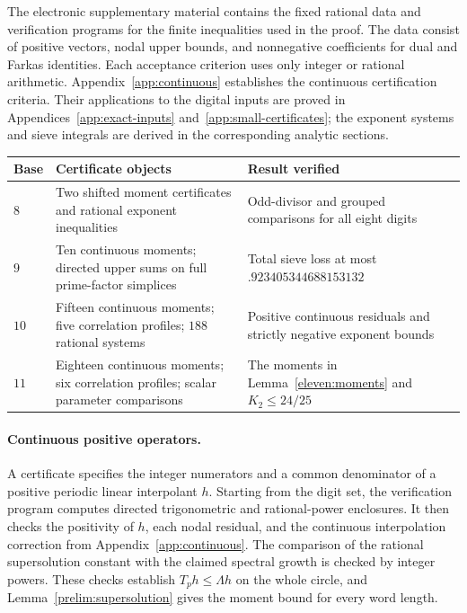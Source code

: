 \documentclass[11pt,a4paper]{article}
\theoremstyle{paperplain}
\numberwithin{equation}{section}
\begin{document}
The electronic supplementary material contains the fixed rational data and
verification programs for the finite inequalities used in the proof.
The data consist of positive vectors, nodal upper bounds, and nonnegative
coefficients for dual and Farkas identities. Each acceptance criterion uses
only integer or rational arithmetic. Appendix~\ref{app:continuous} establishes the continuous certification
criteria. Their applications to the digital inputs are proved in
Appendices~\ref{app:exact-inputs} and~\ref{app:small-certificates}; the
exponent systems and sieve integrals are derived in the corresponding
analytic sections.

\begin{center}
\begin{tabular}{>{\raggedright\arraybackslash}p{}
 >{\raggedright\arraybackslash}p{}
 >{\raggedright\arraybackslash}p{}}
\toprule
Base & Certificate objects & Result verified\\
\midrule
$8$ & Two shifted moment certificates and rational exponent inequalities
 & Odd-divisor and grouped comparisons for all eight digits\\
$9$ & Ten continuous moments; directed upper sums on full prime-factor simplices
 & Total sieve loss at most $.923405344688153132$\\
$10$ & Fifteen continuous moments; five correlation profiles; $188$ rational systems
 & Positive continuous residuals and strictly negative exponent bounds\\
$11$ & Eighteen continuous moments; six correlation profiles; scalar parameter comparisons
 & The moments in Lemma~\ref{eleven:moments} and $K_2\leqslant24/25$\\
\bottomrule
\end{tabular}
\end{center}

\paragraph{Continuous positive operators.}
A certificate specifies the integer numerators and a common denominator
of a positive periodic linear interpolant $h$.
Starting from the digit set, the verification program computes directed
trigonometric and rational-power enclosures. It then checks the positivity
of $h$, each nodal residual, and the continuous interpolation correction
from Appendix~\ref{app:continuous}. The comparison of the rational
supersolution constant with the claimed spectral growth is checked by
integer powers. These checks establish $T_ph\leqslant\Lambda h$
on the whole circle, and Lemma~\ref{prelim:supersolution} gives the
moment bound for every word length.
\end{document}
